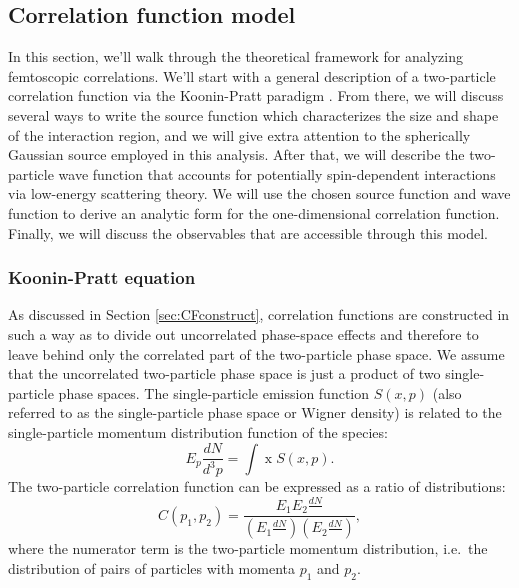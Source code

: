 \subsection{Correlation function model}
\label{sec:CorrelationFunctionModel}

In this section, we'll walk through the theoretical framework for analyzing femtoscopic correlations.
We'll start with a general description of a two-particle correlation function via the Koonin-Pratt paradigm \cite{Koonin:1977fh, Pratt:1990zq, Lisa:2005dd}.
From there, we will discuss several ways to write the source function which characterizes the size and shape of the interaction region, and we will give extra attention to the spherically Gaussian source employed in this analysis.
After that, we will describe the two-particle wave function that accounts for potentially spin-dependent interactions via low-energy scattering theory.
We will use the chosen source function and wave function to derive an analytic form for the one-dimensional correlation function.
Finally, we will discuss the observables that are accessible through this model.
 
\subsubsection{Koonin-Pratt equation}
\label{sec:KooninPratt}

As discussed in Section \ref{sec:CFconstruct}, correlation functions are constructed in such a way as to divide out uncorrelated phase-space effects and therefore to leave behind only the correlated part of the two-particle phase space.
We assume that the uncorrelated two-particle phase space is just a product of two single-particle phase spaces.
The single-particle emission function $S(x,p)$ (also referred to as the single-particle phase space or Wigner density) is related to the single-particle momentum distribution function of the species:
\begin{equation}
\label{eq:SingleParticlePhaseSpace}
E_p\frac{dN}{d^3p} = \int \mathop{d^4x} S(x,p).
\end{equation}
The two-particle correlation function can be expressed as a ratio of distributions:
\begin{equation}
\label{eq:YieldsCF}
C(p_1,p_2) = \frac{E_1E_2\frac{dN}{\mathop{d^3p_1}\mathop{d^3p_2}}}{(E_1\frac{dN}{\mathop{d^3p_1}})(E_2\frac{dN}{\mathop{d^3p_2}})},
\end{equation}
where the numerator term is the two-particle momentum distribution, i.e.\ the distribution of pairs of particles with momenta $p_1$ and $p_2$.

